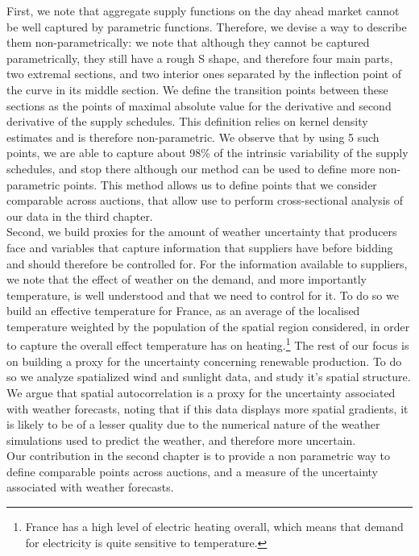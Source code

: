 First, we note that aggregate supply functions on the day ahead market cannot be well captured by parametric functions. Therefore, we devise a way to describe them non-parametrically: we note that although they cannot be captured parametrically, they still have a rough S shape, and therefore four main parts, two extremal sections, and two interior ones separated by the inflection point of the curve in its middle section. We define the transition points between these sections as the points of maximal absolute value for the derivative and second derivative of the supply schedules. This definition relies on kernel density estimates and is therefore non-parametric. We observe that by using 5 such points, we are able to capture about 98\% of the intrinsic variability of the supply schedules, and stop there although our method can be used to define more non-parametric points. This method allows us to define points that we consider comparable across auctions, that allow use to perform cross-sectional analysis of our data in the third chapter. \\

Second, we build proxies for the amount of weather uncertainty that producers face and variables that capture information that suppliers have before bidding and should therefore be controlled for. For the information available to suppliers, we note that the effect of weather on the demand, and more importantly temperature, is well understood and that we need to control for it. To do so we build an effective temperature for France, as an average of the localised temperature weighted by the population of the spatial region considered, in order to capture the overall effect temperature has on heating.\footnote{France has a high level of electric heating overall, which means that demand for electricity is quite sensitive to temperature.} The rest of our focus is on building a proxy for the uncertainty concerning renewable production. To do so we analyze spatialized wind and sunlight data, and study it's spatial structure. We argue that spatial autocorrelation is a proxy for the uncertainty associated with weather forecasts, noting that if this data displays more spatial gradients, it is likely to be of a lesser quality due to the numerical nature of the weather simulations used to predict the weather, and therefore more uncertain.\\

Our contribution in the second chapter is to provide a non parametric way to define comparable points across auctions, and a measure of the uncertainty associated with weather forecasts.\\

